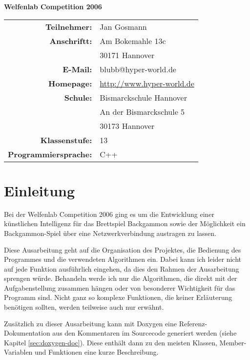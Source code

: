 \documentclass[11pt,a4paper]{scrreprt}
\newcommand{\name}[1]{#1} %
\begin{document}
\begin{titlepage} \begin{center}
  \vspace*{\fill}
  \textsf{\textbf{\huge Welfenlab Competition 2006}} \\[1cm]
  \begin{tabular}{rl}
  \textbf{Teilnehmer:}         & Jan Gosmann \\
  \textbf{Anschriftt:}         & Am Bokemahle 13c \\
                               & 30171 Hannover \\
  \textbf{E-Mail:}             & blubb@hyper-world.de \\
  \textbf{Homepage:}           & \url{http://www.hyper-world.de} \\
  \textbf{Schule:}             & Bismarckschule Hannover \\
                               & An der Bismarckschule 5 \\
                               & 30173 Hannover \\
  \textbf{Klassenstufe:}       & 13 \\
  \textbf{Programmiersprache:} & C++ \\
  \end{tabular}
  \vspace{\fill}
\end{center} \end{titlepage}

\chapter*{Einleitung}
Bei der Welfenlab Competition 2006 ging es um die Entwicklung einer künstlichen Intelligenz für das Brettspiel Backgammon sowie der Möglichkeit ein Backgammon-Spiel über eine Netzwerkverbindung austragen zu lassen.

Diese Ausarbeitung geht auf die Organisation des Projektes, die Bedienung des Programmes und die verwendeten Algorithmen ein. Dabei kann ich leider nicht auf jede Funktion ausführlich eingehen, da dies den Rahmen der Ausarbeitung sprengen würde. Behandeln werde ich nur die Algorithmen, die direkt mit der Aufgabenstellung zusammen hängen oder von besonderer Wichtigkeit für das Programm sind. Nicht ganz so komplexe Funktionen, die keiner Erläuterung benötigen sollten, werden teilweise auch nur erwähnt.

Zusätzlich zu dieser Ausarbeitung kann mit \name{Doxygen} eine Referenz-Dokumentation aus den Kommentaren im Sourcecode generiert werden (siehe Kapitel \ref{sec:doxygen-doc}). Diese enthält dann zu den meisten Klassen, Member-Variablen und Funktionen eine kurze Beschreibung.
\end{document}
